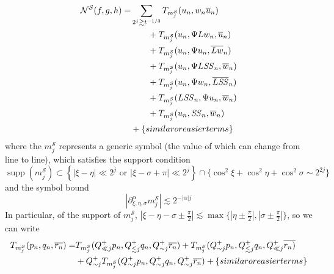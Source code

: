 \documentclass[letterpaper, reqno,final]{amsart}
\DeclareMathOperator{\supp}{supp}
\newcommand{\cS}{\mathcal{S}}
\newcommand{\fhPi}{\frac{\pi}{2}}
\newcommand{\mSS}{\mathit{SS}}
\newcommand{\discrAvg}{\Psi}
\newcommand{\btext}[1]{\left\{\textup{#1}\right\}}
\newcommand{\bsime}{\btext{similar or easier terms}}
\begin{document}
\begin{subequations}\begin{align}
    \mathcal{N}^\cS(f,g,h) =& \sum_{2^j \gtrsim t^{-1/3}} T_{m^\cS_j}(u_n, w_n \overline{u}_n)\label{eqn:m-S-j-no-Psi}\\%
    &\qquad + T_{m^\cS_j}(u_n, \discrAvg L w_n,  \overline{u}_n)\label{eqn:m-S-j-Psi-L-w}\\%
    &\qquad + T_{m^\cS_j}(u_n, \discrAvg u_n,  \overline{Lw}_n)\label{eqn:m-S-j-Psi-SS-L-w}\\%
    &\qquad + T_{m^\cS_j}(u_n, \discrAvg L \mSS_n,  \overline{w}_n)\label{eqn:m-S-j-Psi-L-SS}\\
    &\qquad + T_{m^\cS_j}(u_n, \discrAvg w_n,  \overline{L\mSS}_n)\label{eqn:m-S-j-Psi-w-L-SS}\\
    &\qquad + T_{m^\cS_j}(L\mSS_n, \discrAvg u_n,  \overline{w}_n)\label{eqn:m-S-j-Psi-u-L-SS}\\
    &\qquad + T_{m^\cS_j}(u_n,  \mSS_n,  \overline{w}_n)\label{eqn:m-S-j-u-SS-w}\\%
    &+\bsime \nonumber
\end{align}\end{subequations}
where the $m^\cS_j$ represents a generic symbol (the value of which can change from line to line), which satisfies the support condition
\begin{equation}\label{eqn:m-S-j-supp-cond}
    \supp(m^\cS_j) \subset \left\{|\xi - \eta| \ll 2^j \text{ or }|\xi - \sigma + \pi| \ll 2^j\right\} \cap \{\cos^2 \xi + \cos^2 \eta + \cos^2 \sigma \sim 2^{2j}\}
\end{equation}
and the symbol bound
\begin{equation}\label{eqn:m-S-j-symbol-bound}
    |\partial_{\xi,\eta,\sigma}^\alpha m^\cS_j| \lesssim 2^{-|\alpha|j}
\end{equation}
In particular, of the support of $m_j^\cS$, $|\xi - \eta - \sigma \pm \fhPi| \lesssim \max \{|\eta \pm \fhPi|, |\sigma \pm \fhPi|\}$, so we can write
\begin{equation}\label{eqn:m-S-j-supp-division}\begin{split}
    T_{m^\cS_j}(p_n,q_n,\overline{r_n}) =& T_{m^\cS_j}(Q_{\ll j}^{+}p_n, Q_{\lesssim j}^{+}q_n, Q_{\sim j}^{+}\overline{r_n}) + T_{m^\cS_j}(Q_{\sim j}^{+}p_n, Q_{\lesssim j}^{+}q_n, Q_{\ll j}^{+}\overline{r_n)} \\
    &+ Q_{\sim j}^{+} T_{m^\cS_j}(Q_{\sim j}^{+}p_n, Q_{\sim j}^{+}q_n, Q_{\sim j}^{+}\overline{r_n})+ \bsime
\end{split}\end{equation}
\end{document}
